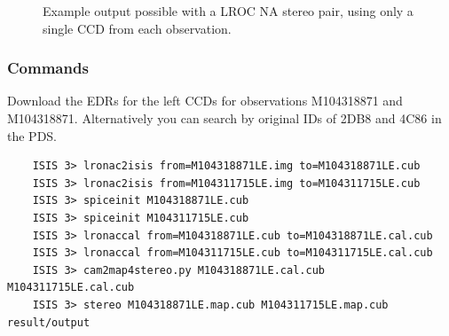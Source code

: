 \begin{figure}[h!]
\centering
  \hfil
\caption{Example output possible with a LROC NA stereo pair, using only a single CCD from each observation.}
\label{fig:lroc-na-example}
\end{figure}

\subsubsection*{Commands}

Download the EDRs for the left CCDs for observations M104318871 and
M104318871. Alternatively you can search by original IDs of 2DB8 and
4C86 in the PDS.

\begin{verbatim}
    ISIS 3> lronac2isis from=M104318871LE.img to=M104318871LE.cub
    ISIS 3> lronac2isis from=M104311715LE.img to=M104311715LE.cub
    ISIS 3> spiceinit M104318871LE.cub
    ISIS 3> spiceinit M104311715LE.cub
    ISIS 3> lronaccal from=M104318871LE.cub to=M104318871LE.cal.cub
    ISIS 3> lronaccal from=M104311715LE.cub to=M104311715LE.cal.cub
    ISIS 3> cam2map4stereo.py M104318871LE.cal.cub M104311715LE.cal.cub
    ISIS 3> stereo M104318871LE.map.cub M104311715LE.map.cub result/output
\end{verbatim}

